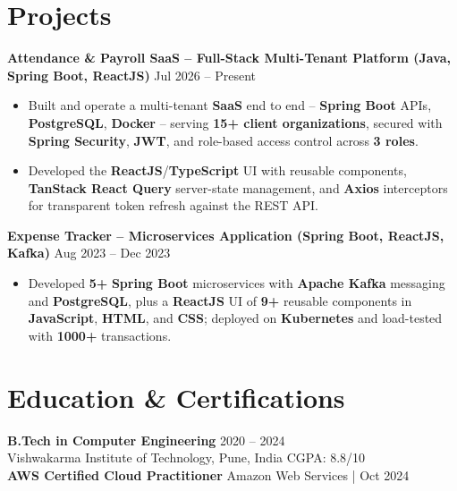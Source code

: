 \documentclass[a4paper,10pt]{article}
\begin{document}
\section*{Projects}

\textbf{Attendance \& Payroll SaaS -- Full-Stack Multi-Tenant Platform (Java, Spring Boot, ReactJS)} \hfill Jul 2026 -- Present
\begin{itemize}[leftmargin=*]
    \item Built and operate a multi-tenant \textbf{SaaS} end to end -- \textbf{Spring Boot} APIs, \textbf{PostgreSQL}, \textbf{Docker} -- serving \textbf{15+ client organizations}, secured with \textbf{Spring Security}, \textbf{JWT}, and role-based access control across \textbf{3 roles}.
    \item Developed the \textbf{ReactJS}/\textbf{TypeScript} UI with reusable components, \textbf{TanStack React Query} server-state management, and \textbf{Axios} interceptors for transparent token refresh against the REST API.
\end{itemize}

\textbf{Expense Tracker -- Microservices Application (Spring Boot, ReactJS, Kafka)} \hfill Aug 2023 -- Dec 2023
\begin{itemize}[leftmargin=*]
    \item Developed \textbf{5+} \textbf{Spring Boot} microservices with \textbf{Apache Kafka} messaging and \textbf{PostgreSQL}, plus a \textbf{ReactJS} UI of \textbf{9+} reusable components in \textbf{JavaScript}, \textbf{HTML}, and \textbf{CSS}; deployed on \textbf{Kubernetes} and load-tested with \textbf{1000+} transactions.
\end{itemize}

\section*{Education \& Certifications}
\textbf{B.Tech in Computer Engineering} \hfill 2020 -- 2024 \\
Vishwakarma Institute of Technology, Pune, India \hfill CGPA: 8.8/10 \\
\textbf{AWS Certified Cloud Practitioner} \hfill Amazon Web Services \;|\; Oct 2024
\end{document}
